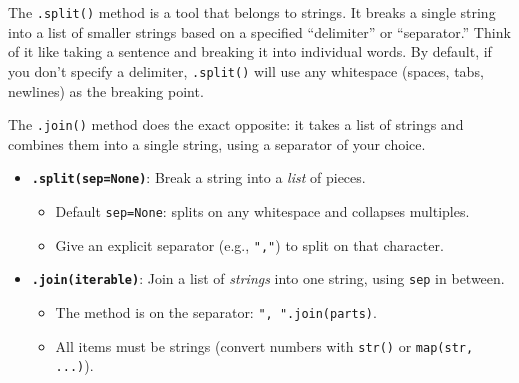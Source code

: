 The \texttt{.split()} method is a tool that belongs to strings. It breaks a single string into a list of smaller strings based on a specified “delimiter” or “separator.” Think of it like taking a sentence and breaking it into individual words. By default, if you don't specify a delimiter, \texttt{.split()} will use any whitespace (spaces, tabs, newlines) as the breaking point.

The \texttt{.join()} method does the exact opposite: it takes a list of strings and combines them into a single string, using a separator of your choice.
\begin{itemize}
  \item \textbf{\texttt{.split(sep=None)}}: Break a string into a \emph{list} of pieces.
    \begin{itemize}[label=\textcolor{blue}{--}, leftmargin=1.8em]
      \item Default \texttt{sep=None}: splits on any whitespace and collapses multiples.
      \item Give an explicit separator (e.g., \texttt{","}) to split on that character.
    \end{itemize}

  \item \textbf{\texttt{.join(iterable)}}: Join a list of \emph{strings} into one string, using \texttt{sep} in between.
    \begin{itemize}[label=\textcolor{blue}{--}, leftmargin=1.8em]
      \item The method is on the separator: \texttt{", ".join(parts)}.
      \item All items must be strings (convert numbers with \texttt{str()} or \texttt{map(str, ...)}).
    \end{itemize}
\end{itemize}



